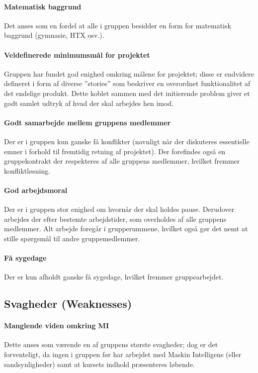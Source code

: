 \paragraph{Matematisk baggrund}
Det anses som en fordel at alle i gruppen besidder en form for matematisk baggrund (gymnasie, HTX osv.).

\paragraph{Veldefinerede minimumsmål for projektet}
Gruppen har fundet god enighed omkring målene for projektet; disse er endvidere defineret i form af diverse ''stories'' som beskriver en overordnet funktionalitet af det endelige produkt.
Dette koblet sammen med det initierende problem giver et godt samlet udtryk af hvad der skal arbejdes hen imod.

\paragraph{Godt samarbejde mellem gruppens medlemmer}
Der er i gruppen kun ganske få konflikter (navnligt når der diskuteres essentielle emner i forhold til fremtidig retning af projektet).
Der forefindes også en gruppekontrakt der respekteres af alle gruppens medlemmer, hvilket fremmer konfliktløsning.

\paragraph{God arbejdsmoral}
Der er i gruppen stor enighed om hvornår der skal holdes pause.
Derudover arbejdes der efter bestemte arbejdstider, som overholdes af alle gruppens medlemmer.
Alt arbejde foregår i grupperummene, hvilket også gør det nemt at stille spørgsmål til andre gruppemedlemmer.

\paragraph{Få sygedage}
Der er kun afholdt ganske få sygedage, hvilket fremmer gruppearbejdet.

\subsection{Svagheder \textnormal{(\textbf{W}eaknesses)}}\label{swot:weaknesses}

\paragraph{Manglende viden omkring MI}\label{swot:manglende_viden_mi}
Dette anses som værende en af gruppens største svagheder; dog er det forventeligt, da ingen i gruppen før har arbejdet med Maskin Intelligens (eller sandsynligheder) samt at kursets indhold præsenteres løbende.


